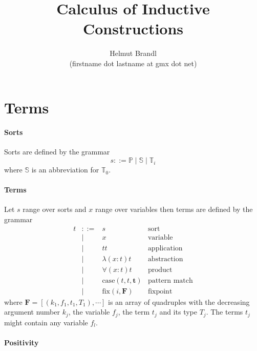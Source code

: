 \documentclass[12pt]{article}
\def\Fbold{\mathbf{F}}
\def\tbold{\mathbf{t}}
\def\Prop{\mathbb{P}}
\def\Set{\mathbb{S}}
\def\Type{\mathbb{T}}
\def\case{\text{case}}
\def\fix {\text{fix}}
\theoremstyle{definition} \newtheorem{definition}{Definition}[section]
\theoremstyle{definition} \newtheorem{theorem}[definition]{Theorem}
\theoremstyle{definition} \newtheorem{lemma}[definition]{Lemma}
\begin{document}
\title{Calculus of Inductive Constructions}
\author{Helmut Brandl \\ \scriptsize (firstname dot lastname at gmx dot net)}
\date{}


\maketitle

\abstract{
}

\tableofcontents




\section{Terms}
\label{sec:terms}


\paragraph{Sorts} Sorts are defined by the grammar
$$ s  ::=  \Prop \mid \Set \mid \Type_i$$
where $\Set$ is an abbreviation for $\Type_0$.

\paragraph{Terms} Let $s$ range over sorts and $x$ range over variables then
terms are defined by the grammar
$$
\begin{array}{llll}
  t & ::= & s & \text{sort} \\
    &\mid & x & \text{variable}\\
    &\mid & t t &   \text{application}\\
    &\mid & \lambda (x:t) t &\text{abstraction} \\
    &\mid & \forall (x:t) t &\text{product} \\
    &\mid & \case(t,t,\tbold) &\text{pattern match}\\
    &\mid & \fix (i,\Fbold) & \text{fixpoint}
\end{array}
$$
where $\Fbold = [(k_1,f_1,t_1,T_1), \cdots ]$ is an array of quadruples with
the decreasing argument number $k_j$, the variable $f_j$, the term $t_j$ and
its type $T_j$. The terms $t_j$ might contain any variable $f_l$.


\paragraph{Positivity}
\end{document}
